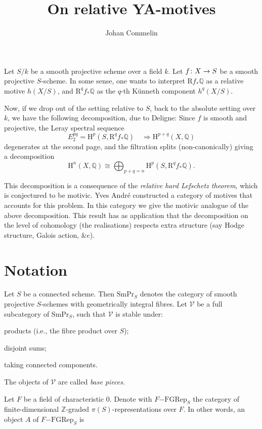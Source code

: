 \documentclass[a4paper,10pt]{article}
\title{On relative YA-motives}
\author{Johan Commelin}
\makeatletter
\newcommand*\map@arrow[1][]{\csname#1rightarrow\endcsname{}}
\newcommand*\function@textstyle[4][]{#2\colon#3\map@arrow[#1]#4}
\newcommand*\function[4][]{%
	\mathchoice
	{\function@textstyle[long#1]{#2}{#3}{#4}}
	{\function@textstyle[#1]{#2}{#3}{#4}}
	{\function@textstyle[#1]{#2}{#3}{#4}}
	{\function@textstyle[#1]{#2}{#3}{#4}}
}
\def\basepieces{\mathscr{V}}
\def\smpr{\mathrm{SmPr}}
\newcommand{\fgrep}[2]{#1\mathrm{-FGRep}_{#2}}
\def\coh{\mathrm{H}}
\makeatother
\begin{document}
\maketitle

Let $S/k$ be a smooth projective scheme over a field $k$. Let
$\function{f}{X}{S}$ be a smooth projective $S$-scheme. In some sense, one
wants to interpret $\mathrm{R}f_{*}\mathbb{Q}$ as a relative motive $h(X/S)$,
and $\mathrm{R}^{q}f_{*}\mathbb{Q}$ as the $q$-th K\"{u}nneth component
$h^{q}(X/S)$.

Now, if we drop out of the setting relative to $S$, back to the absolute
setting over $k$, we have the following decomposition, due to Deligne:
Since $f$ is smooth and projective, the Leray spectral sequence
\[
	E_{2}^{pq} = \coh^{p}(S, \mathrm{R}^{q}f_{*}\mathbb{Q})
	\quad \Rightarrow \coh^{p+q}(X, \mathbb{Q})
\]
degenerates at the second page, and the filtration splits (non-canonically)
giving a decomposition
\[
	\coh^{n}(X, \mathbb{Q}) \cong \bigoplus_{p+q = n}
	\coh^{p}(S, \mathrm{R}^{q}f_{*}\mathbb{Q}).
\]

This decomposition is a consequence of the \emph{relative hard Lefschetz
theorem}, which is conjectured to be motivic. Yves Andr\'{e} constructed a
category of motives that accounts for this problem. In this category we give
the motivic analogue of the above decomposition. This result has as application
that the decomposition on the level of cohomology (the realisations) respects
extra structure (say Hodge structure, Galois action, \&c).

\section{Notation}

Let $S$ be a connected scheme. Then $\smpr_{S}$ denotes the category of smooth
projective $S$-schemes with geometrically integral fibres. Let $\basepieces$ be
a full subcategory of $\smpr_{S}$, such that $\basepieces$ is stable under:
\begin{enumerate*}[label=(\alph*)] %
	\item products (i.e., the fibre product over $S$);
	\item disjoint sums;
	\item taking connected components.
\end{enumerate*} %
The objects of $\basepieces$ are called \emph{base pieces}.

Let $F$ be a field of characteristic $0$. Denote with $\fgrep{F}{S}$ the
category of finite-dimensional $\mathbb{Z}$-graded $\pi(S)$-representations
over $F$. In other words, an object $A$ of $\fgrep{F}{S}$ is
\end{document}
